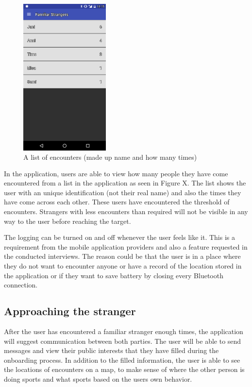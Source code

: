 \begin{figure}[htb]
	\begin{center}
		\includegraphics[width=0.4\textwidth]{encounters.png}
		\caption{A list of encounters (made up name and how many times)}	
	\end{center}
\end{figure}


In the application, users are able to view how many people they have come encountered from a list in the application as seen in Figure X. The list shows the user with an unique identification (not their real name) and also the times they have come across each other. These users have encountered the threshold of encounters. Strangers with less encounters than required will not be visible in any way to the user before reaching the target.

The logging can be turned on and off whenever the user feels like it. This is a requirement from the mobile application providers and also a feature requested in the conducted interviews. The reason could be that the user is in a place where they do not want to encounter anyone or have a record of the location stored in the application or if they want to save battery by closing every Bluetooth connection.

\subsection{Approaching the stranger}

After the user has encountered a familiar stranger enough times, the application will suggest communication between both parties. The user will be able to send messages and view their public interests that they have filled during the onboarding process. In addition to the filled information, the user is able to see the locations of encounters on a map, to make sense of where the other person is doing sports and what sports based on the users own behavior. 

